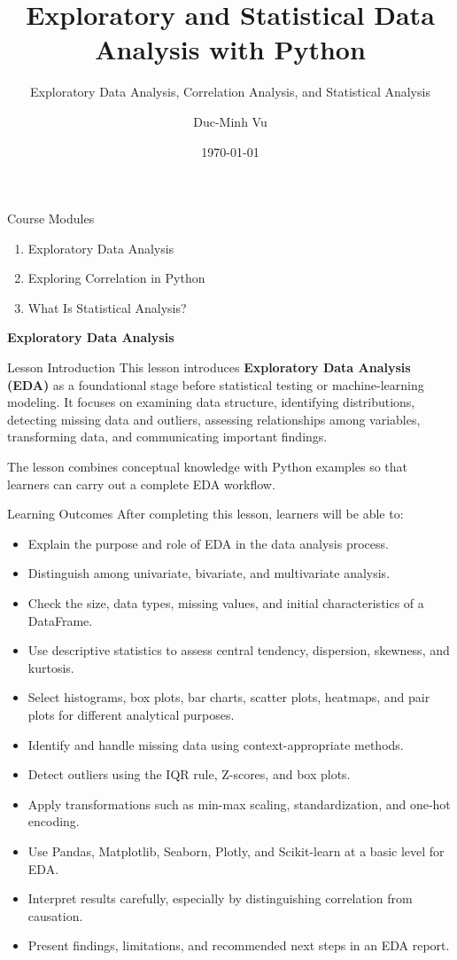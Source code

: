 \documentclass[aspectratio=169,11pt]{beamer}
\title[EDA, Correlation, and Statistics]{Exploratory and Statistical Data Analysis with Python}
\subtitle{Exploratory Data Analysis, Correlation Analysis, and Statistical Analysis}
\author{Duc-Minh Vu}
\institute{SLSCM Lab - FDA - NEU}
\date{\today}
\begin{document}
\begin{frame}\titlepage\end{frame}
\begin{frame}{Course Modules}
\begin{enumerate}
\item Exploratory Data Analysis
\item Exploring Correlation in Python
\item What Is Statistical Analysis?
\end{enumerate}
\end{frame}
\begin{frame}
\centering\vfill
{\Huge\textcolor{TitleBlue}{\textbf{Exploratory Data Analysis}}}
\vfill\end{frame}
\begin{frame}[allowframebreaks]{Lesson Introduction}
\small
This lesson introduces \textbf{Exploratory Data Analysis (EDA)} as a foundational stage before statistical testing or machine-learning modeling. It focuses on examining data structure, identifying distributions, detecting missing data and outliers, assessing relationships among variables, transforming data, and communicating important findings.\par\medskip
The lesson combines conceptual knowledge with Python examples so that learners can carry out a complete EDA workflow.\par\medskip
\end{frame}
\begin{frame}[allowframebreaks]{Learning Outcomes}
\footnotesize
After completing this lesson, learners will be able to:\par\medskip
\begin{itemize}
\item Explain the purpose and role of EDA in the data analysis process.
\item Distinguish among univariate, bivariate, and multivariate analysis.
\item Check the size, data types, missing values, and initial characteristics of a DataFrame.
\item Use descriptive statistics to assess central tendency, dispersion, skewness, and kurtosis.
\item Select histograms, box plots, bar charts, scatter plots, heatmaps, and pair plots for different analytical purposes.
\item Identify and handle missing data using context-appropriate methods.
\item Detect outliers using the IQR rule, Z-scores, and box plots.
\item Apply transformations such as min-max scaling, standardization, and one-hot encoding.
\item Use Pandas, Matplotlib, Seaborn, Plotly, and Scikit-learn at a basic level for EDA.
\item Interpret results carefully, especially by distinguishing correlation from causation.
\item Present findings, limitations, and recommended next steps in an EDA report.
\end{itemize}
\end{frame}
\end{document}
